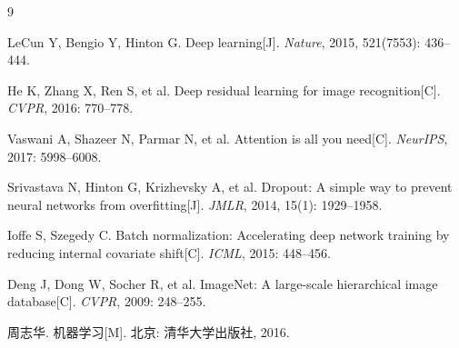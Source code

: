 \documentclass{harryopo-report}
\begin{document}
\begin{thebibliography}{9}

 LeCun Y, Bengio Y, Hinton G. Deep learning[J]. \emph{Nature}, 2015, 521(7553): 436--444.

 He K, Zhang X, Ren S, et al. Deep residual learning for image recognition[C]. \emph{CVPR}, 2016: 770--778.

 Vaswani A, Shazeer N, Parmar N, et al. Attention is all you need[C]. \emph{NeurIPS}, 2017: 5998--6008.

 Srivastava N, Hinton G, Krizhevsky A, et al. Dropout: A simple way to prevent neural networks from overfitting[J]. \emph{JMLR}, 2014, 15(1): 1929--1958.

 Ioffe S, Szegedy C. Batch normalization: Accelerating deep network training by reducing internal covariate shift[C]. \emph{ICML}, 2015: 448--456.

 Deng J, Dong W, Socher R, et al. ImageNet: A large-scale hierarchical image database[C]. \emph{CVPR}, 2009: 248--255.

 周志华. 机器学习[M]. 北京: 清华大学出版社, 2016.

\end{thebibliography}
\end{document}
